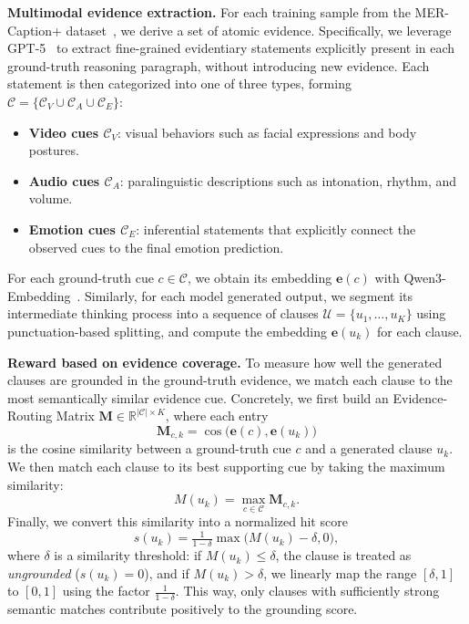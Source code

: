 \documentclass{article}
\theoremstyle{plain}
\theoremstyle{definition}
\theoremstyle{remark}
\begin{document}
\noindent\textbf{Multimodal evidence extraction.}
For each training sample from the MER-Caption+ dataset~\cite{lian2025affectgpt}, we derive a set of atomic evidence. 
Specifically, we leverage GPT-5~\cite{singh2025openai} to extract fine-grained evidentiary statements explicitly present in each ground-truth reasoning paragraph, without introducing new evidence.
Each statement is then categorized into one of three types, forming $\mathcal{C} =\{ \mathcal{C}_V \cup \mathcal{C}_A \cup \mathcal{C}_E\}$:
\begin{itemize}
    \item \textbf{Video cues $\mathcal{C}_V$}: visual behaviors such as facial expressions and body postures. 
    \item \textbf{Audio cues $\mathcal{C}_A$}: paralinguistic descriptions such as intonation, rhythm, and volume. 
    \item \textbf{Emotion cues $\mathcal{C}_E$}: inferential statements that explicitly connect the observed cues to the final emotion prediction.
\end{itemize}
For each ground-truth cue $c \in \mathcal{C}$, we obtain its embedding $\mathbf{e}(c)$ with Qwen3-Embedding~\cite{zhang2025qwen3}. Similarly, for each model generated output, we segment its intermediate thinking process into a sequence of  clauses $\mathcal{U} = \{u_1,\dots,u_K\}$ using punctuation-based splitting, and compute the embedding $\mathbf{e}(u_k)$ for each clause.



\noindent\textbf{Reward based on evidence coverage.}
To measure how well the generated clauses are grounded in the ground-truth evidence, we match each clause to the most semantically similar evidence cue. Concretely, we first build an Evidence-Routing Matrix $\mathbf{M}\in\mathbb{R}^{|\mathcal{C}|\times K}$, where each entry
\begin{equation}\label{eq:M}
    \mathbf{M}_{c,k} = \cos\bigl(\mathbf{e}(c), \mathbf{e}(u_k)\bigr)
\end{equation}
is the cosine similarity between a ground-truth cue $c$ and a generated clause $u_k$.
We then match each clause to its best supporting cue by taking the maximum similarity:
\begin{equation}
M(u_k)=\max_{c\in\mathcal{C}}\mathbf{M}_{c,k}.
\end{equation}
Finally, we convert this similarity into a normalized hit score
\begin{equation}
\label{eq:cue_score}
s(u_k)=\tfrac{1}{1-\delta}\max\bigl({M}(u_k)-\delta,0\bigr),
\end{equation}
where $\delta$ is a similarity threshold: if ${M}(u_k)\le\delta$, the clause is treated as \emph{ungrounded} ($s(u_k)=0$), and if ${M}(u_k)>\delta$, we linearly map the range $[\delta,1]$ to $[0,1]$ using the factor $\tfrac{1}{1-\delta}$. This way, only clauses with sufficiently strong semantic matches contribute positively to the grounding score.
\end{document}
